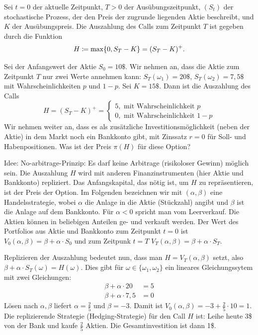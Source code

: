 \documentclass[a4paper,twoside,DIV15,BCOR12mm]{scrbook}
\begin{document}
\begin{beispiel}
Sei $t=0$ der aktuelle Zeitpunkt, $T>0$ der Ausübungszeitpunkt, $(S_t)$ der stochastische Prozess, der den Preis der zugrunde liegenden Aktie beschreibt, und $K$ der Ausübungspreis. Die Auszahlung des Calls zum Zeitpunkt $T$ ist gegeben durch die Funktion 
\[
H \da \max\{0,S_T - K\} = (S_T-K)^+.
\]

Sei der Anfangswert der Aktie $S_0=10\$$. Wir nehmen an, dass die Aktie zum Zeitpunkt $T$ nur zwei Werte annehmen kann: $S_T(\omega_1) = 20\$$, $S_T(\omega_2) = 7,5\$$ mit Wahrscheinlichkeiten $p$ und $1-p$. Sei $K=15\$$. Dann ist die Auszahlung des Calls
\[
H= (S_T-K)^+ = 
\begin{cases}
5, \text{ mit Wahrscheinlichkeit $p$}\\
0, \text{ mit Wahrscheinlichkeit $1-p$}
\end{cases}
\]
Wir nehmen weiter an, dass es als zusätzliche Investitionsmöglichkeit (neben der Aktie) in dem Markt noch ein Bankkonto gibt, mit Zinssatz $r=0$ für Soll- und Habenpositionen. Was ist der Preis $\pi(H)$ für diese Option?

Idee: No-arbitrage-Prinzip: Es darf keine Arbitrage (risikoloser Gewinn) möglich sein. Die Auszahlung $H$ wird mit anderen Finanzinstrumenten (hier Aktie und Bankkonto) repliziert. Das Anfangskapital, das nötig ist, um $H$ zu repräsentieren, ist der Preis der Option. Im Folgenden bezeichnen wir mit $(\alpha, \beta)$ eine Handelsstrategie, wobei $\alpha$ die Anlage in die Aktie (Stückzahl) angibt und $\beta$ ist die Anlage auf dem Bankkonto. Für $\alpha<0$ spricht man vom Leerverkauf. Die Aktien können in beliebigen Anteilen ge- und verkauft werden. Der Wert des Portfolios aus Aktie und Bankkonto zum Zeitpunkt $t=0$ ist $V_0(\alpha,\beta) = \beta + \alpha\cdot S_0$ und zum Zeitpunk $t=T$ $V_T(\alpha,\beta) = \beta + \alpha \cdot S_T$.

Replizieren der Auszahlung bedeutet nun, dass man $H=V_T(\alpha,\beta)$ setzt, also $\beta + \alpha \cdot S_T(\omega) = H(\omega)$. Dies gibt für $\omega \in \{\omega_1,\omega_2\}$ ein lineares Gleichungssytem mit zwei Gleichungen:
\begin{align*}
\beta + \alpha \cdot 20  &= 5 \\
\beta + \alpha \cdot 7,5  &= 0 
\end{align*}
Lösen nach $\alpha, \beta$ liefert $\alpha=\frac 25$ und $\beta = -3$. Damit ist $V_0(\alpha,\beta) = -3 + \frac25\cdot 10 = 1$. Die replizierende Strategie (Hedging-Strategie) für den Call $H$ ist: Leihe heute 3\$ von der Bank und kaufe $\frac25$ Aktien. Die Gesamtinvestition ist dann 1\$.


\end{beispiel}
\end{document}
